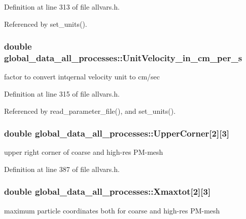 Definition at line 313 of file allvars.h.



Referenced by set\_\-units().

\hypertarget{structglobal__data__all__processes_a04f4a1972c99f3ab4ba2483237a9d8ab}{
\subsubsection[{UnitVelocity\_\-in\_\-cm\_\-per\_\-s}]{\setlength{\rightskip}{0pt plus 5cm}double {\bf global\_\-data\_\-all\_\-processes::UnitVelocity\_\-in\_\-cm\_\-per\_\-s}}}
\label{structglobal__data__all__processes_a04f4a1972c99f3ab4ba2483237a9d8ab}
factor to convert intqernal velocity unit to cm/sec 

Definition at line 315 of file allvars.h.



Referenced by read\_\-parameter\_\-file(), and set\_\-units().

\hypertarget{structglobal__data__all__processes_a2a0fb0d1cda3309f002d1c0984209111}{
\subsubsection[{UpperCorner}]{\setlength{\rightskip}{0pt plus 5cm}double {\bf global\_\-data\_\-all\_\-processes::UpperCorner}\mbox{[}2\mbox{]}\mbox{[}3\mbox{]}}}
\label{structglobal__data__all__processes_a2a0fb0d1cda3309f002d1c0984209111}
upper right corner of coarse and high-\/res PM-\/mesh 

Definition at line 387 of file allvars.h.

\hypertarget{structglobal__data__all__processes_a3818f3c9b2979834f6938c7f18b39b0e}{
\subsubsection[{Xmaxtot}]{\setlength{\rightskip}{0pt plus 5cm}double {\bf global\_\-data\_\-all\_\-processes::Xmaxtot}\mbox{[}2\mbox{]}\mbox{[}3\mbox{]}}}
\label{structglobal__data__all__processes_a3818f3c9b2979834f6938c7f18b39b0e}
maximum particle coordinates both for coarse and high-\/res PM-\/mesh 

